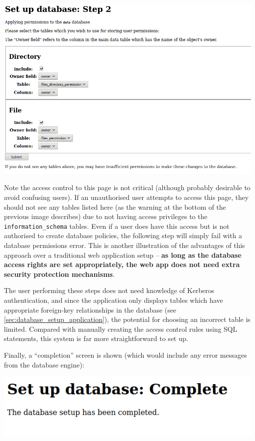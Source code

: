 \documentclass[12pt]{report}
\begin{document}
\begin{center}
  \includegraphics[width=\textwidth]{03-setup2.png}
\end{center}

Note the access control to this page is not critical (although probably desirable to avoid confusing users). If an unauthorised user attempts to access this page, they should not see any tables listed here (as the warning at the bottom of the previous image describes) due to not having access privileges to the \verb+information_schema+ tables. Even if a user does have this access but is not authorised to create database policies, the following step will simply fail with a database permissions error. This is another illustration of the advantages of this approach over a traditional web application setup -- \textbf{as long as the database access rights are set appropriately, the web app does not need extra security protection mechanisms}.

The user performing these steps does not need knowledge of Kerberos authentication, and since the application only displays tables which have appropriate foreign-key relationships in the database (see \autoref{sec:database_setup_application}), the potential for choosing an incorrect table is limited. Compared with manually creating the access control rules using SQL statements, this system is far more straightforward to set up.

Finally, a ``completion'' screen is shown (which would include any error messages from the database engine):

\begin{center}
  \includegraphics[scale=0.5]{04-setup3.png}
\end{center}
\end{document}
